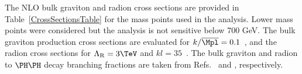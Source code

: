 The NLO bulk graviton and radion cross sections are provided in Table~\ref{CrossSectionsTable} for the mass points used in the analysis. Lower mass points were considered but the analysis is not sensitive below 700 GeV. The bulk graviton production cross sections are evaluated for $k/\overline{\Mpl} = 0.1$~\cite{WED_BG_13TeV}, and the radion cross sections for $\Lambda_{\rm R} = 3\TeV$ and $kl = 35$~\cite{WED_radion_13TeV}. The bulk graviton and radion to $\PH\PH$ decay branching fractions are taken from Refs.~\cite{WED_BGHHDecay_13TeV} and \cite{WED_radionHHDecay_13TeV}, respectively.


